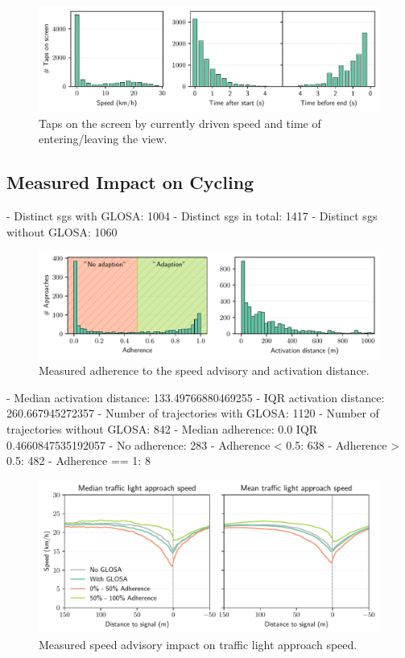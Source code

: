\begin{figure}[t]
\caption{Taps on the screen by currently driven speed and time of entering/leaving the view.}\label{fig:app-user-interaction-speed}
\includegraphics[width=\linewidth]{images/app-user-interaction-speed.pdf}
\end{figure}


\subsection{Measured Impact on Cycling}

- Distinct sgs with GLOSA: 1004
- Distinct sgs in total: 1417
- Distinct sgs without GLOSA: 1060

\begin{figure}[t]
\caption{Measured adherence to the speed advisory and activation distance.}\label{fig:impacts-adherence-activation-distance}
\includegraphics[width=\linewidth]{images/impacts-adherence-activation-distance.pdf}
\end{figure}

- Median activation distance: 133.49766880469255 
- IQR activation distance: 260.667945272357
- Number of trajectories with GLOSA: 1120 
- Number of trajectories without GLOSA: 842
- Median adherence: 0.0 IQR 0.4660847535192057
- No adherence: 283 
- Adherence < 0.5: 638 
- Adherence > 0.5: 482 
- Adherence == 1: 8

\begin{figure}[t]
\caption{Measured speed advisory impact on traffic light approach speed.}\label{fig:impacts-approach-speed}
\includegraphics[width=\linewidth]{images/impacts-approach-speed.pdf}
\end{figure}


